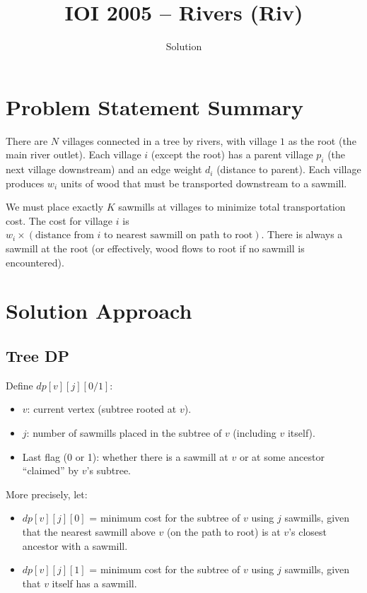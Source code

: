 \documentclass[11pt,a4paper]{article}
\title{IOI 2005 -- Rivers (Riv)}
\author{Solution}
\date{}
\begin{document}
\maketitle

\section{Problem Statement Summary}
There are $N$ villages connected in a tree by rivers, with village $1$ as the root (the main river outlet). Each village $i$ (except the root) has a parent village $p_i$ (the next village downstream) and an edge weight $d_i$ (distance to parent). Each village produces $w_i$ units of wood that must be transported downstream to a sawmill.

We must place exactly $K$ sawmills at villages to minimize total transportation cost. The cost for village $i$ is $w_i \times (\text{distance from } i \text{ to nearest sawmill on path to root})$. There is always a sawmill at the root (or effectively, wood flows to root if no sawmill is encountered).

\section{Solution Approach}

\subsection{Tree DP}
Define $dp[v][j][0/1]$:
\begin{itemize}
    \item $v$: current vertex (subtree rooted at $v$).
    \item $j$: number of sawmills placed in the subtree of $v$ (including $v$ itself).
    \item Last flag (0 or 1): whether there is a sawmill at $v$ or at some ancestor ``claimed'' by $v$'s subtree.
\end{itemize}

More precisely, let:
\begin{itemize}
    \item $dp[v][j][0]$ = minimum cost for the subtree of $v$ using $j$ sawmills, given that the nearest sawmill above $v$ (on the path to root) is at $v$'s closest ancestor with a sawmill.
    \item $dp[v][j][1]$ = minimum cost for the subtree of $v$ using $j$ sawmills, given that $v$ itself has a sawmill.
\end{itemize}
\end{document}

